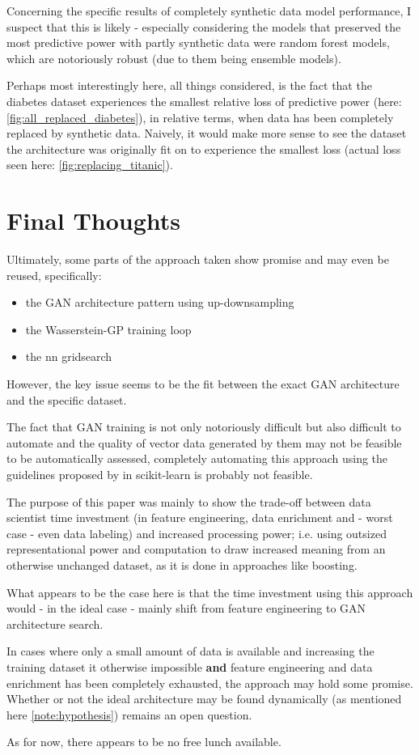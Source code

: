 Concerning the specific results of completely synthetic data model performance, I suspect that this is likely - especially considering the models that preserved the most predictive power with partly synthetic data were random forest models, which are notoriously robust (due to them being ensemble models).

Perhaps most interestingly here, all things considered, is the fact that the diabetes dataset experiences the smallest relative loss of predictive power (here: \ref{fig:all_replaced_diabetes}), in relative terms, when data has been completely replaced by synthetic data. Naively, it would make more sense to see the dataset the architecture was originally fit on to experience the smallest loss (actual loss seen here: \ref{fig:replacing_titanic}).

\pagebreak

\section{Final Thoughts}

Ultimately, some parts of the approach taken show promise and may even be reused, specifically:

\begin{itemize}
	\item the \ac{GAN} architecture pattern using up-downsampling
	\item the Wasserstein-GP training loop
	\item the \ac{nn} gridsearch
\end{itemize}

However, the key issue seems to be the fit between the exact \ac{GAN} architecture and the specific dataset.

The fact that \ac{GAN} training is not only notoriously difficult but also difficult to automate and the quality of vector data generated by them may not be feasible to be automatically assessed, completely automating this approach using the guidelines proposed by \cite{buitinck2013api} in scikit-learn is probably not feasible.

The purpose of this paper was mainly to show the trade-off between data scientist time investment (in feature engineering, data enrichment and - worst case - even data labeling) and increased processing power; i.e. using outsized representational power and computation to draw increased meaning from an otherwise unchanged dataset, as it is done in approaches like \ac{boosting}.

What appears to be the case here is that the time investment using this approach would - in the ideal case - mainly shift from feature engineering to \ac{GAN} architecture search.

In cases where only a small amount of data is available and increasing the training dataset it otherwise impossible \textbf{and} feature engineering and data enrichment has been completely exhausted, the approach may hold some promise. Whether or not the ideal architecture may be found dynamically (as mentioned here \ref{note:hypothesis}) remains an open question.

As for now, there appears to be no free lunch available.

\pagebreak
